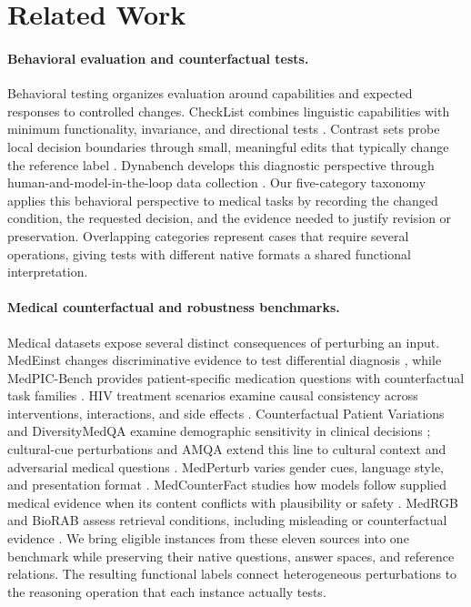 \section{Related Work}
\label{sec:related-work}

\paragraph{Behavioral evaluation and counterfactual tests.}
Behavioral testing organizes evaluation around capabilities and expected responses to controlled changes. CheckList combines linguistic capabilities with minimum functionality, invariance, and directional tests \citep{ribeiro2020checklist}. Contrast sets probe local decision boundaries through small, meaningful edits that typically change the reference label \citep{gardner2020contrastsets}. Dynabench develops this diagnostic perspective through human-and-model-in-the-loop data collection \citep{kiela2021dynabench}. Our five-category taxonomy applies this behavioral perspective to medical tasks by recording the changed condition, the requested decision, and the evidence needed to justify revision or preservation. Overlapping categories represent cases that require several operations, giving tests with different native formats a shared functional interpretation.

\paragraph{Medical counterfactual and robustness benchmarks.}
Medical datasets expose several distinct consequences of perturbing an input. MedEinst changes discriminative evidence to test differential diagnosis \citep{chen2026medeinst}, while MedPIC-Bench provides patient-specific medication questions with counterfactual task families \citep{medpicbench}. HIV treatment scenarios examine causal consistency across interventions, interactions, and side effects \citep{prosperi2026hiv}. Counterfactual Patient Variations and DiversityMedQA examine demographic sensitivity in clinical decisions \citep{benkirane2025bias,rawat2024diversitymedqa}; cultural-cue perturbations and AMQA extend this line to cultural context and adversarial medical questions \citep{rezaei2026cultural,xiao2025amqa}. MedPerturb varies gender cues, language style, and presentation format \citep{gourabathina2025medperturb}. MedCounterFact studies how models follow supplied medical evidence when its content conflicts with plausibility or safety \citep{mo2026faithfulness}. MedRGB and BioRAB assess retrieval conditions, including misleading or counterfactual evidence \citep{ngo2024medrgb,li2025biorab}. We bring eligible instances from these eleven sources into one benchmark while preserving their native questions, answer spaces, and reference relations. The resulting functional labels connect heterogeneous perturbations to the reasoning operation that each instance actually tests.


